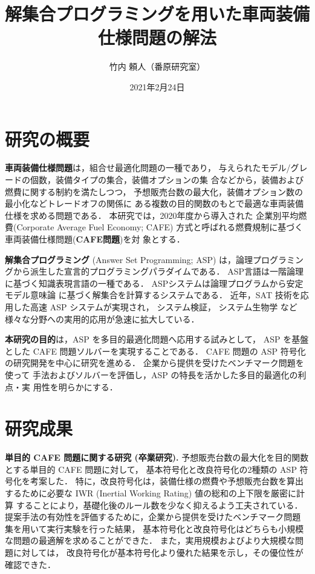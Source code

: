 \documentclass[a4j,10pt]{jarticle}
\title{解集合プログラミングを用いた車両装備仕様問題の解法}
\author{竹内 頼人（番原研究室）}
\date{2021年2月24日}
\begin{document}
\maketitle
\thispagestyle{empty}
\begin{multicols}{1}

\section{研究の概要}
\textbf{車両装備仕様問題}は，組合せ最適化問題の一種であり，
与えられたモデル/グレードの個数，装備タイプの集合，装備オプションの集
合などから，装備および燃費に関する制約を満たしつつ，
予想販売台数の最大化，装備オプション数の最小化などトレードオフの関係に
ある複数の目的関数のもとで最適な車両装備仕様を求める問題である．
本研究では，2020年度から導入された
企業別平均燃費(Corporate Average Fuel Economy; CAFE)
方式と呼ばれる燃費規制に基づく車両装備仕様問題(\textbf{CAFE問題})を対
象とする．

\textbf{解集合プログラミング}
(Answer Set Programming; ASP)
は，論理プログラミングから派生した宣言的プログラミングパラダイムである．
ASP言語は一階論理に基づく知識表現言語の一種である．
ASPシステムは論理プログラムから安定モデル意味論
に基づく解集合を計算するシステムである．
近年，SAT 技術を応用した高速 ASP システムが実現され，
システム検証，
システム生物学
など様々な分野への実用的応用が急速に拡大している．

\textbf{本研究の目的}は，ASP を多目的最適化問題へ応用する試みとして，
ASP を基盤とした CAFE 問題ソルバーを実現することである．
CAFE 問題の ASP 符号化の研究開発を中心に研究を進める．
企業から提供を受けたベンチマーク問題を使って
手法およびソルバーを評価し，ASP の特長を活かした多目的最適化の利点・実
用性を明らかにする．

\section{研究成果}

\textbf{単目的 CAFE 問題に関する研究 (卒業研究). }
予想販売台数の最大化を目的関数とする単目的 CAFE 問題に対して，
基本符号化と改良符号化の2種類の ASP 符号化を考案した．
特に，改良符号化は，装備仕様の燃費や予想販売台数を算出するために必要な
IWR (Inertial Working Rating) 値の総和の上下限を厳密に計算
することにより，基礎化後のルール数を少なく抑えるよう工夫されている．
%
提案手法の有効性を評価するために，企業から提供を受けたベンチマーク問題
集を用いて実行実験を行った結果，
基本符号化と改良符号化はどちらも小規模な問題の最適解を求めることができた．
また，実用規模およびより大規模な問題に対しては，
改良符号化が基本符号化より優れた結果を示し，その優位性が確認できた．


\end{multicols}
\end{document}

